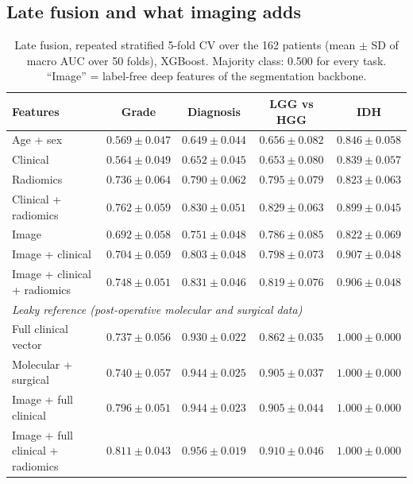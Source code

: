 \documentclass[11pt]{article}
\begin{document}
\subsection{Late fusion and what imaging adds}
\begin{table}[t]
\centering
\caption{Late fusion, repeated stratified 5-fold CV over the 162 patients (mean $\pm$ SD of macro AUC over 50 folds),
XGBoost. Majority class: 0.500 for every task. ``Image'' = label-free deep features of the segmentation backbone.}
\label{tab:kfold}
\small
\begin{tabular}{lcccc}
\toprule
Features & Grade & Diagnosis & LGG vs HGG & IDH \\
\midrule
Age + sex & $0.569 \pm 0.047$ & $0.649 \pm 0.044$ & $0.656 \pm 0.082$ & $0.846 \pm 0.058$ \\
Clinical & $0.564 \pm 0.049$ & $0.652 \pm 0.045$ & $0.653 \pm 0.080$ & $0.839 \pm 0.057$ \\
Radiomics & $0.736 \pm 0.064$ & $0.790 \pm 0.062$ & $0.795 \pm 0.079$ & $0.823 \pm 0.063$ \\
Clinical + radiomics & $\mathbf{0.762 \pm 0.059}$ & $0.830 \pm 0.051$ & $\mathbf{0.829 \pm 0.063}$ & $0.899 \pm 0.045$ \\
Image & $0.692 \pm 0.058$ & $0.751 \pm 0.048$ & $0.786 \pm 0.085$ & $0.822 \pm 0.069$ \\
Image + clinical & $0.704 \pm 0.059$ & $0.803 \pm 0.048$ & $0.798 \pm 0.073$ & $\mathbf{0.907 \pm 0.048}$ \\
Image + clinical + radiomics & $0.748 \pm 0.051$ & $\mathbf{0.831 \pm 0.046}$ & $0.819 \pm 0.076$ & $0.906 \pm 0.048$ \\
\midrule
\multicolumn{5}{l}{\emph{Leaky reference (post-operative molecular and surgical data)}} \\
Full clinical vector & $0.737 \pm 0.056$ & $0.930 \pm 0.022$ & $0.862 \pm 0.035$ & $1.000 \pm 0.000$ \\
Molecular + surgical & $0.740 \pm 0.057$ & $0.944 \pm 0.025$ & $0.905 \pm 0.037$ & $1.000 \pm 0.000$ \\
Image + full clinical & $0.796 \pm 0.051$ & $0.944 \pm 0.023$ & $0.905 \pm 0.044$ & $1.000 \pm 0.000$ \\
Image + full clinical + radiomics & $0.811 \pm 0.043$ & $0.956 \pm 0.019$ & $0.910 \pm 0.046$ & $1.000 \pm 0.000$ \\
\bottomrule
\end{tabular}
\end{table}
\end{document}
